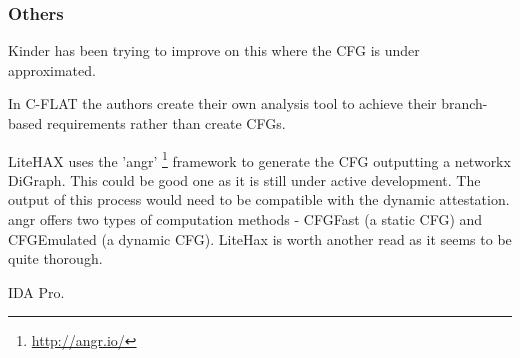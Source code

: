 \subsubsection{Others}

Kinder \cite{Kinder2012} has been trying to improve on this where the CFG is under approximated.

In C-FLAT \cite{Abera2016} the authors create their own analysis tool to achieve their branch-based requirements rather than create CFGs.

LiteHAX \cite{Dessouky2018} uses the 'angr' \footnote{\url{http://angr.io/}} \cite{Shoshitaishvili2016} framework to generate the CFG outputting a networkx DiGraph. This could be good one as it is still under active development. The output of this process would need to be compatible with the dynamic attestation. angr offers two types of computation methods - CFGFast (a static CFG) and CFGEmulated (a dynamic CFG). LiteHax is worth another read as it seems to be quite thorough.

IDA Pro. 